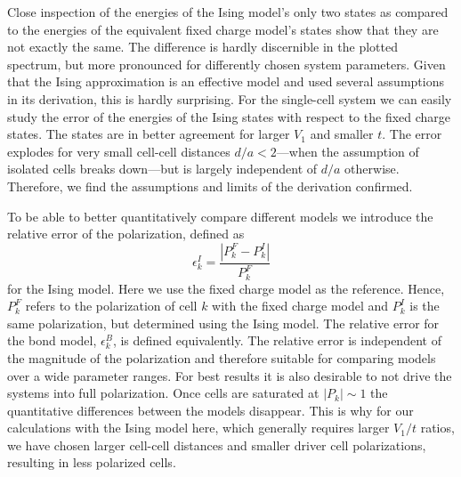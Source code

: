 Close inspection of the energies of the Ising model's only two states as
compared to the energies of the equivalent fixed charge model's states show that
they are not exactly the same. The difference is hardly discernible in the
plotted spectrum, but more pronounced for differently chosen system parameters.
Given that the Ising approximation is an effective model and used several
assumptions in its derivation, this is hardly surprising. For the single-cell
system we can easily study the error of the energies of the Ising states with
respect to the fixed charge states. The states are in better agreement for
larger $V_1$ and smaller $t$. The error explodes for very small cell-cell
distances $d/a < 2$---when the assumption of isolated cells breaks down---but is
largely independent of $d/a$ otherwise. Therefore, we find the assumptions and
limits of the derivation confirmed.

To be able to better quantitatively compare different models we introduce the
relative error of the polarization, defined as
%
\begin{equation}
  \epsilon^I_k = \frac{\left|P^F_k - P^I_k\right|}{P^F_k}
\end{equation}
%
for the Ising model. Here we use the fixed charge model as the reference. Hence,
$P^F_k$ refers to the polarization of cell $k$ with the fixed charge
model and $P^I_k$ is the same polarization, but determined using the Ising
model. The relative error for the bond model, $\epsilon^B_k$, is defined
equivalently. The relative error is independent of the magnitude of the
polarization and therefore suitable for comparing models over a wide parameter
ranges. For best results it is also desirable to not drive the systems
into full polarization. Once cells are saturated at $\left| P_k \right| \sim 1$
the quantitative differences between the models disappear. This is why for our
calculations with the Ising model here, which generally requires larger $V_1/t$
ratios, we have chosen larger cell-cell distances and smaller driver cell
polarizations, resulting in less polarized cells.

